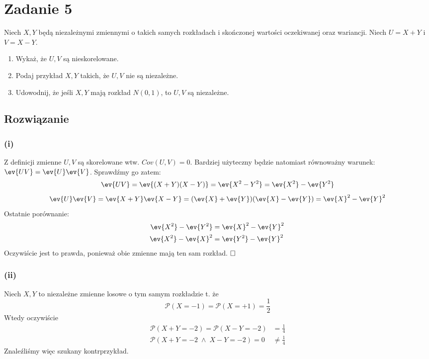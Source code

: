 \section{Zadanie 5}
Niech \(X, Y\) będą niezależnymi zmiennymi o takich samych rozkładach i skończonej wartości oczekiwanej oraz wariancji. Niech \(U = X+Y\) i \(V = X-Y\).

\begin{enumerate}[label=(\roman*), itemsep=0pt, topsep=0pt, partopsep=0pt, parsep=0pt]
	\item Wykaż, że \(U, V\) są nieskorelowane.
	\item Podaj przykład \(X, Y\) takich, że \(U, V\) nie są niezależne.
	\item Udowodnij, że jeśli \(X, Y\) mają rozkład \(N(0, 1)\), to \(U, V\) są niezależne.
\end{enumerate}

\subsection*{Rozwiązanie}
\subsubsection*{(i)}
Z definicji zmienne \(U, V\) są skorelowane wtw. \(Cov(U, V) = 0\). Bardziej użyteczny będzie natomiast równoważny warunek: \(\ev{UV} = \ev{U} \ev{V}\). Sprawdźmy go zatem:
\[
	\ev{UV} = \ev{(X+Y)(X-Y)} = \ev{X^2 - Y^2} = \ev{X^2} - \ev{Y^2}
\]
\[
	\ev{U} \ev{V} = \ev{X+Y} \ev{X-Y} = (\ev{X} + \ev{Y})(\ev{X} - \ev{Y}) = \ev{X}^2 - \ev{Y}^2
\]
Ostatnie porównanie:
\begin{align*}
	\ev{X^2} - \ev{Y^2} & = \ev{X}^2 - \ev{Y}^2   \\
	\ev{X^2} - \ev{X}^2 & = \ev{Y^2} - \ev{Y}^2 \
\end{align*}
Oczywiście jest to prawda, ponieważ obie zmienne mają ten sam rozkład. \(\hfill \square\)

\subsubsection*{(ii)}
Niech \(X, Y\) to niezależne zmienne losowe o tym samym rozkładzie t. że
\[
	\mathcal{P}(X=-1)=\mathcal{P}(X=+1)=\frac{1}{2}
\]
Wtedy oczywiście
\begin{align*}
	\mathcal{P}(X+Y=-2) = \mathcal{P}(X-Y=-2)  & = \frac{1}{4}      \\
	\mathcal{P}(X+Y=-2 \; \land \; X-Y=-2) = 0 & \not = \frac{1}{4}
\end{align*}
Znaleźliśmy więc szukany kontrprzykład.

